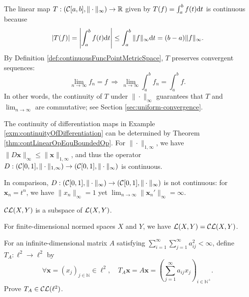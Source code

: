 \begin{exm}
  \label{exm:integralAsCLmap}
  The linear map $T: ({\cal C}[a,b],\|\cdot\|_{\infty})\rightarrow
  \mathbb{R}$
  given by $T(f) = \int_a^b f(t) \mathrm{d} t$ is continuous
  because
  \begin{displaymath}
    |T(f)| = \left|\int_a^b f(t) \mathrm{d} t\right|
    \le \int_a^b\|f\|_{\infty}\mathrm{d} t
    = (b-a) \|f\|_{\infty}.
  \end{displaymath}
  By Definition \ref{def:continuousFuncPointMetricSpace}, 
  $T$ preserves convergent sequences:
  \begin{displaymath}
    \lim_{n\rightarrow \infty} f_n = f
    \ \Rightarrow\
    \lim_{n\rightarrow \infty} \int_a^b f_n = \int_a^b f.
  \end{displaymath}
  In other words, the continuity of $T$
  under $\|\cdot\|_{\infty}$ guarantees
  that $T$ and $\lim_{n\rightarrow \infty}$ are commutative;
  see Section \ref{sec:uniform-convergence}.
\end{exm}

\begin{exm}
  The continuity of differentiation maps in Example
  \ref{exm:continuityOfDifferentiation}
  can be determined by Theorem \ref{thm:contLinearOpEquBoundedOp}.
  For $\|\cdot\|_{1,\infty}$,
  we have $\|D \mathbf{x}\|_{\infty} \le \|\mathbf{x}\|_{1,\infty}$, 
  and thus the operator $D: \left({\cal C}[0,1],\|\cdot\|_{1,\infty}\right)
  \rightarrow \left({\cal C}[0,1],\|\cdot\|_{\infty}\right)$
  is continuous.
  
  In comparison,
  $D: \left({\cal C}[0,1],\|\cdot\|_{\infty}\right)
  \rightarrow \left({\cal C}[0,1],\|\cdot\|_{\infty}\right)$
  is not continuous: 
  for $\mathbf{x}_n=t^n$, we have $\|x_n\|_{\infty}=1$ yet 
  $\lim_{n\rightarrow \infty} \|\mathbf{x}_n'\|_{\infty} = \infty$.
\end{exm}

\begin{coro}
  \label{coro:CLXYisSubspaceOfLXY}
  ${\cal CL}(X,Y)$ is a subspace of ${\cal L}(X,Y)$.
\end{coro}

\begin{coro}
  \label{coro:finiteDimCLXYisLXY}
  For finite-dimensional normed spaces $X$ and $Y$,
  we have ${\cal L}(X,Y)={\cal CL}(X,Y)$.
\end{coro}

\begin{exc}
  For an infinite-dimensional matrix $A$ satisfying
  $\sum_{i=1}^{\infty}\sum_{j=1}^{\infty}a_{ij}^2<\infty$,
  define $T_A: \ell^2\rightarrow \ell^2$
  by
  \begin{equation}
    \label{eq:inftMatrixL2}
    \forall \mathbf{x}=(x_j)_{j\in \mathbb{N}}\in \ell^2,\quad
    T_A \mathbf{x} = A \mathbf{x} =
    \left(\sum_{j=1}^{\infty} a_{ij}x_j \right)_{i\in \mathbb{N}^+}.
  \end{equation}
  Prove $T_A\in {\cal CL}(\ell^2)$.
\end{exc}

